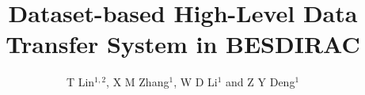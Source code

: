 \documentclass[a4paper]{jpconf}
\begin{document}
\title{Dataset-based High-Level Data Transfer System in BESDIRAC}

\author{T Lin$^{1,2}$, X M Zhang$^1$, W D Li$^1$ and Z Y Deng$^1$}
\address{$^1$ Institute of High Energy Physics, 
            19B Yuquan Road,
            Beijing 100049,
            People's Republic of China}
\address{$^2$ University of Chinese Academy Sciences,
            19A Yuquan Road,
            Beijing 100049,
            People's Republic of China}












\end{document}
